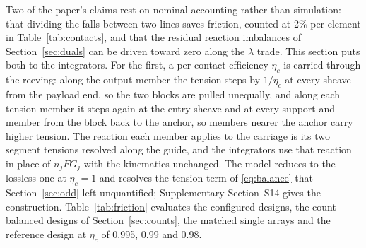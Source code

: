 \documentclass[preprint,12pt,number]{elsarticle}
\begin{document}
Two of the paper's claims rest on nominal accounting rather than simulation: that dividing the falls between two lines saves friction, counted at 2\% per element in Table~\ref{tab:contacts}, and that the residual reaction imbalances of Section~\ref{sec:duals} can be driven toward zero along the $\lambda$ trade. This section puts both to the integrators. For the first, a per-contact efficiency $\eta_c$ is carried through the reeving: along the output member the tension steps by $1/\eta_c$ at every sheave from the payload end, so the two blocks are pulled unequally, and along each tension member it steps again at the entry sheave and at every support and member from the block back to the anchor, so members nearer the anchor carry higher tension. The reaction each member applies to the carriage is its two segment tensions resolved along the guide, and the integrators use that reaction in place of $n_j F G_j$ with the kinematics unchanged. The model reduces to the lossless one at $\eta_c = 1$ and resolves the tension term of \eqref{eq:balance} that Section~\ref{sec:odd} left unquantified; Supplementary Section~S14 gives the construction. Table~\ref{tab:friction} evaluates the configured designs, the count-balanced designs of Section~\ref{sec:counts}, the matched single arrays and the reference design at $\eta_c$ of 0.995, 0.99 and 0.98.
\end{document}
